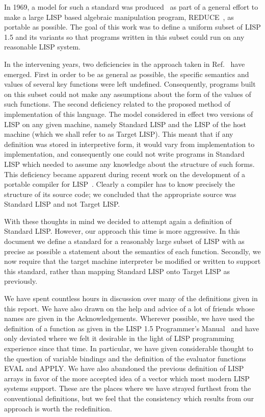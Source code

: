In 1969, a model for such a standard was produced~\cite{Hearn:69} as
part of a general effort to make a large LISP based algebraic
manipulation program, REDUCE~\cite{REDUCE3.3}, as portable as
possible.  The goal of this work was to define a uniform subset of
LISP 1.5 and its variants so that programs written in this subset
could run on any reasonable LISP system.

In the intervening years, two deficiencies in the approach taken in
Ref.~\cite{Hearn:69} have emerged. First in order to be as general as
possible, the specific semantics and values of several key functions
were left undefined. Consequently, programs built on this subset could
not make any assumptions about the form of the values of such
functions. The second deficiency related to the proposed method of
implementation of this language. The model considered in effect two
versions of LISP on any given machine, namely Standard LISP and the
LISP of the host machine (which we shall refer to as Target LISP).
This meant that if any definition was stored in interpretive form, it
would vary from implementation to implementation, and consequently one
could not write programs in Standard LISP which needed to assume any
knowledge about the structure of such forms. This deficiency became
apparent during recent work on the development of a portable compiler
for LISP~\cite{PLC}. Clearly a compiler has to know precisely the
structure of its source code; we concluded that the appropriate source
was Standard LISP and not Target LISP.

With these thoughts in mind we decided to attempt again a definition
of Standard LISP. However, our approach this time is more aggressive.
In this document we define a standard for a reasonably large subset of
LISP with as precise as possible a statement about the semantics of
each function. Secondly, we now require that the target machine
interpreter be modified or written to support this standard, rather
than mapping Standard LISP onto Target LISP as previously.

We have spent countless hours in discussion over many of the
definitions given in this report. We have also drawn on the help and
advice of a lot of friends whose names are given in the
Acknowledgements. Wherever possible, we have used the definition of a
function as given in the LISP 1.5 Programmer's Manual~\cite{LISP1.5}
and have only deviated where we felt it desirable in the light of LISP
programming experience since that time. In particular, we have given
considerable thought to the question of variable bindings and the
definition of the evaluator functions EVAL and APPLY. We have also
abandoned the previous definition of LISP arrays in favor of the more
accepted idea of a vector which most modern LISP systems support.
These are the places where we have strayed furthest from the
conventional definitions, but we feel that the consistency which
results from our approach is worth the redefinition.

